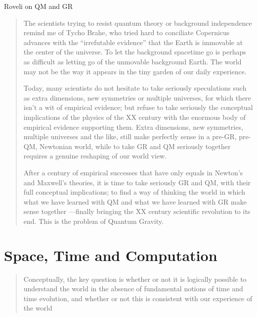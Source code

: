 \documentclass{article}
\begin{document}
Roveli on QM and GR 
\begin{quotation}
   The scientists trying to resist quantum theory or background independence remind me of Tycho
Brahe, who tried hard to conciliate Copernicus advances with the “irrefutable evidence” that the
Earth is immovable at the center of the universe. To let the background spacetime go is perhaps as
diﬃcult as letting go of the unmovable background Earth. The world may not be the way it appears
in the tiny garden of our daily experience.

Today, many scientists do not hesitate to take seriously speculations such as extra dimensions,
new symmetries or multiple universes, for which there isn’t a wit of empirical evidence; but refuse to
take seriously the conceptual implications of the physics of the XX century with the enormous body
of empirical evidence supporting them. Extra dimensions, new symmetries, multiple universes and
the like, still make perfectly sense in a pre-GR, pre-QM, Newtonian world, while to take GR and QM
seriously together requires a genuine reshaping of our world view.

After a century of empirical successes that have only equals in Newton’s and Maxwell’s theories, it
is time to take seriously GR and QM, with their full conceptual implications; to ﬁnd a way of thinking
the world in which what we have learned with QM and what we have learned with GR make sense
together —ﬁnally bringing the XX century scientiﬁc revolution to its end. This is the problem of
Quantum Gravity. 
 \par
  \hfill \autocite{Rovelli2006UnfinishedRevolution}
\end{quotation}

\section{Space, Time and Computation}
\begin{quotation}
    Conceptually, the key question is whether or not it is logically possible to understand the world in
the absence of fundamental notions of time and time evolution, and whether or not this is consistent
with our experience of the world
\par
\hfill \autocite{Rovelli2006UnfinishedRevolution}
\end{quotation}
\appendix
\end{document}
